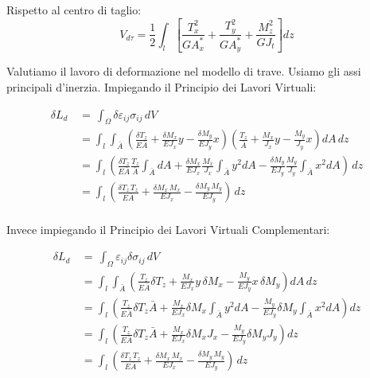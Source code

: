 Rispetto al centro di taglio:
\begin{equation*}
    V_{d\tau}= \frac{1}{2} \int_l 
    \left[
        \frac{T_x^2}{G A^*_x} 
        + \frac{T_y^2}{G A^*_y} 
        + \frac{M_z^2}{G J_t}
    \right] dz
\end{equation*}


Valutiamo il lavoro di deformazione nel modello di trave. Usiamo gli assi principali d'inerzia. Impiegando il Principio dei Lavori Virtuali:

\begin{align*}
     \delta L_d \,&=\, \int_\Omega \delta\varepsilon_{ij}\sigma_{ij} \, dV \\
     &=  \int_l \int_{\bar{A}} 
    \left(
        \frac{\delta T_z}{E \bar{A}} 
        + \frac{\delta M_x}{E J_x} y 
        - \frac{\delta M_y}{E J_y} x
    \right)
    \left(
        \frac{T_z}{\bar{A}} 
        + \frac{M_x}{J_x} y 
        - \frac{M_y}{J_y} x
    \right)
    dA \, dz \\
    &=  \int_l 
    \left(
        \frac{\delta  T_z}{E \bar{A}} \frac{T_z}{\bar{A}} \int_{\bar{A}} dA
        + \frac{\delta M_x}{E J_x} \frac{M_x}{J_x} \int_{\bar{A}} y^2 dA
        - \frac{\delta M_y}{E J_y} \frac{M_y}{J_y} \int_{\bar{A}} x^2 dA
    \right) \, dz \\
    &=  \int_l 
    \left(
        \frac{\delta  T_z \, T_z}{E \bar{A}} 
        + \frac{\delta M_x \, M_x}{E J_x} 
        - \frac{\delta M_y \, M_y}{E J_y} 
    \right) \, dz \\
\end{align*}

Invece impiegando il Principio dei Lavori Virtuali Complementari:

\begin{align*}
    \delta L_d \,&=\, \int_\Omega \varepsilon_{ij} \delta \sigma_{ij} \, dV \\
    &= \int_l \int_{\bar{A}} 
    \left(
        \frac{T_z}{E \bar{A}} \delta T_z 
        + \frac{M_x}{E J_x} y \, \delta M_x
        - \frac{M_y}{E J_y} x \, \delta M_y
    \right) dA \, dz \\
    &= \int_l 
    \left(
        \frac{T_z}{E \bar{A}} \delta T_z \bar{A} 
        + \frac{M_x}{E J_x} \delta M_x \int_{\bar{A}} y^2 dA
        - \frac{M_y}{E J_y} \delta M_y \int_{\bar{A}} x^2 dA
    \right) dz \\
    &= \int_l 
    \left(
        \frac{T_z}{E \bar{A}} \delta T_z \bar{A} 
        + \frac{M_x}{E J_x} \delta M_x J_x
        - \frac{M_y}{E J_y} \delta M_y J_y
    \right) dz \\
    &= \int_l 
    \left(
        \frac{\delta  T_z \, T_z}{E \bar{A}} 
        + \frac{\delta M_x \, M_x}{E J_x} 
        - \frac{\delta M_y \, M_y}{E J_y} 
    \right) \, dz \\
\end{align*}

